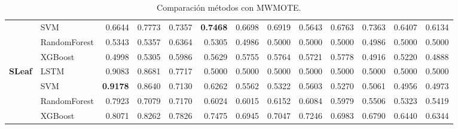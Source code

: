 \begin{table}[h]
\begin{adjustbox}{max width=15cm}
\begin{tabular}{|c|l|r|r|r|r|r|r|r|r|r|r|r|}
		& SVM &  0.6644 &  0.7773 &  0.7357 &  \textbf{0.7468} &  0.6698 &  0.6919 &  0.5643 &  0.6763 &  0.7363 &  0.6407 &  0.6134 \\
		& RandomForest &  0.5343 &  0.5357 &  0.6364 &  0.5305 &  0.4986 &  0.5000 &  0.5000 &  0.5000 &  0.4986 &  0.5000 &  0.5000 \\
		& XGBoost &  0.4998 &  0.5305 &  0.5986 &  0.5629 &  0.5755 &  0.5764 &  0.5721 &  0.5778 &  0.4916 &  0.5220 &  0.4888 \\
		\hline
		\textbf{SLeaf} & LSTM &  0.9083 &  0.8681 &  0.7717 &  0.5000 &  0.5000 &  0.5000 &  0.5000 &  0.5000 &  0.5000 &  0.5000 &  0.5000 \\
		& SVM &  \textbf{0.9178} &  0.8640 &  0.7130 &  0.6262 &  0.5562 &  0.5322 &  0.5603 &  0.5270 &  0.5061 &  0.4956 &  0.4973 \\
		& RandomForest &  0.7923 &  0.7079 &  0.7170 &  0.6024 &  0.6015 &  0.6152 &  0.6084 &  0.5979 &  0.5506 &  0.5323 &  0.5419 \\
		& XGBoost &  0.8071 &  0.8262 &  0.7826 &  0.7475 &  0.6945 &  0.7047 &  0.7246 &  0.6983 &  0.6790 &  0.6440 &  0.6344 \\
		\hline
\end{tabular}
\end{adjustbox}
\caption{Comparación métodos con MWMOTE.}
\label{tab:all_comp_mwmote}
\end{table}
\newpage
